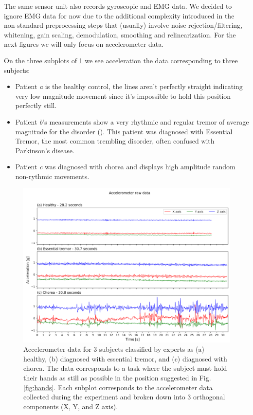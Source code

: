 The same sensor unit also records gyroscopic and EMG data. We decided to ignore EMG data for now due to the additional complexity introduced in the non-standard preprocessing steps that (usually) involve noise rejection/filtering, whitening, gain scaling, demodulation, smoothing and relinearization. For the next figures we will only focus on accelerometer data.


On the three subplots of \cref{fig:acc} we see acceleration the data corresponding to three subjects: 
\begin{itemize}
    \item Patient \textit{a} is the healthy control, the lines aren't perfectly straight indicating very low magnitude movement since it's impossible to hold this position perfectly still.
    \item Patient \textit{b}'s measurements show a very rhythmic and regular tremor of average magnitude for the disorder (). This patient was diagnosed with Essential Tremor, the most common trembling disorder, often confused with Parkinson's disease.
    \item Patient \textit{c} was diagnosed with chorea and displays high amplitude random non-rythmic movements. 
\end{itemize}
 

\begin{figure}[ht]
\centering
\includegraphics[width=\linewidth]{figures/nemo/acc2.png}
\caption{Accelerometer data for 3 subjects classified by experts as (a) healthy, (b) diagnosed with essential tremor, and (c) diagnosed with chorea. The data corresponds to a task where the subject must hold their hands as still as possible in the position suggested in Fig. \ref{fig:hands}.
Each subplot corresponds to the accelerometer data collected during the experiment and broken down into 3 orthogonal components (X, Y, and Z axis). }
\label{fig:acc}
\end{figure}


